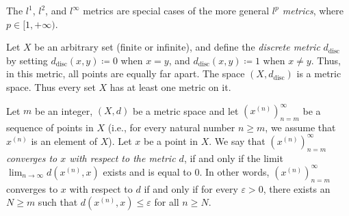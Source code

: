 \begin{remark}\label{1.1.10}
    The \(l^1\), \(l^2\), and \(l^\infty\) metrics are special cases of the more general \emph{\(l^p\) metrics}, where \(p \in [1, +\infty)\).
\end{remark}

\begin{example}\label{1.1.11}
    Let \(X\) be an arbitrary set (finite or infinite), and define the \emph{discrete metric} \(d_{\text{disc}}\) by setting \(d_{\text{disc}}(x, y) \coloneqq 0\) when \(x = y\), and \(d_{\text{disc}}(x, y) \coloneqq 1\) when \(x \neq y\).
    Thus, in this metric, all points are equally far apart.
    The space \((X, d_{\text{disc}})\) is a metric space.
    Thus every set \(X\) has at least one metric on it.
\end{example}

\setcounter{theorem}{13}
\begin{definition}\label{1.1.14}
    Let \(m\) be an integer, \((X, d)\) be a metric space and let \((x^{(n)})_{n = m}^\infty\) be a sequence of points in \(X\)
    (i.e., for every natural number \(n \geq m\), we assume that \(x^{(n)}\) is an element of \(X\)).
    Let \(x\) be a point in \(X\).
    We say that \emph{\((x^{(n)})_{n = m}^\infty\) converges to \(x\) with respect to the metric \(d\)}, if and only if the limit \(\lim_{n \to \infty} d(x^{(n)}, x)\) exists and is equal to \(0\).
    In other words, \((x^{(n)})_{n = m}^\infty\) converges to \(x\) with respect to \(d\) if and only if for every \(\varepsilon > 0\), there exists an \(N \geq m\) such that \(d(x^{(n)}, x) \leq \varepsilon\) for all \(n \geq N\).
\end{definition}